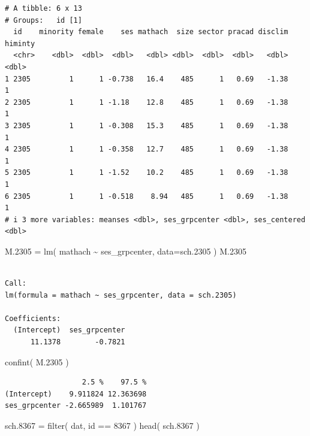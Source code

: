 \documentclass[
  letterpaper,
  DIV=11,
  numbers=noendperiod]{scrreprt}
\newenvironment{Shaded}{\begin{snugshade}}{\end{snugshade}}
\newcommand{\AttributeTok}[1]{\textcolor[rgb]{0.49,0.56,0.16}{#1}}
\newcommand{\DecValTok}[1]{\textcolor[rgb]{0.25,0.63,0.44}{#1}}
\newcommand{\FloatTok}[1]{\textcolor[rgb]{0.25,0.63,0.44}{#1}}
\newcommand{\FunctionTok}[1]{\textcolor[rgb]{0.02,0.16,0.49}{#1}}
\newcommand{\NormalTok}[1]{\textcolor[rgb]{0.00,0.44,0.13}{#1}}
\newcommand{\OtherTok}[1]{\textcolor[rgb]{0.00,0.44,0.13}{#1}}
\newcommand{\SpecialCharTok}[1]{\textcolor[rgb]{0.25,0.44,0.63}{#1}}
\begin{document}
\begin{verbatim}
# A tibble: 6 x 13
# Groups:   id [1]
  id    minority female    ses mathach  size sector pracad disclim himinty
  <chr>    <dbl>  <dbl>  <dbl>   <dbl> <dbl>  <dbl>  <dbl>   <dbl>   <dbl>
1 2305         1      1 -0.738   16.4    485      1   0.69   -1.38       1
2 2305         1      1 -1.18    12.8    485      1   0.69   -1.38       1
3 2305         1      1 -0.308   15.3    485      1   0.69   -1.38       1
4 2305         1      1 -0.358   12.7    485      1   0.69   -1.38       1
5 2305         1      1 -1.52    10.2    485      1   0.69   -1.38       1
6 2305         1      1 -0.518    8.94   485      1   0.69   -1.38       1
# i 3 more variables: meanses <dbl>, ses_grpcenter <dbl>, ses_centered <dbl>
\end{verbatim}

\begin{Shaded}
\begin{Highlighting}[]
\NormalTok{M}\FloatTok{.2305} \OtherTok{=} \FunctionTok{lm}\NormalTok{( mathach }\SpecialCharTok{\textasciitilde{}}\NormalTok{ ses\_grpcenter, }\AttributeTok{data=}\NormalTok{sch}\FloatTok{.2305}\NormalTok{ )}
\NormalTok{M}\FloatTok{.2305}
\end{Highlighting}
\end{Shaded}

\begin{verbatim}

Call:
lm(formula = mathach ~ ses_grpcenter, data = sch.2305)

Coefficients:
  (Intercept)  ses_grpcenter  
      11.1378        -0.7821  
\end{verbatim}

\begin{Shaded}
\begin{Highlighting}[]
\FunctionTok{confint}\NormalTok{( M}\FloatTok{.2305}\NormalTok{ )}
\end{Highlighting}
\end{Shaded}

\begin{verbatim}
                  2.5 %    97.5 %
(Intercept)    9.911824 12.363698
ses_grpcenter -2.665989  1.101767
\end{verbatim}

\begin{Shaded}
\begin{Highlighting}[]
\NormalTok{sch}\FloatTok{.8367} \OtherTok{=} \FunctionTok{filter}\NormalTok{( dat, id }\SpecialCharTok{==} \DecValTok{8367}\NormalTok{ )}
\FunctionTok{head}\NormalTok{( sch}\FloatTok{.8367}\NormalTok{ )}
\end{Highlighting}
\end{Shaded}
\end{document}
